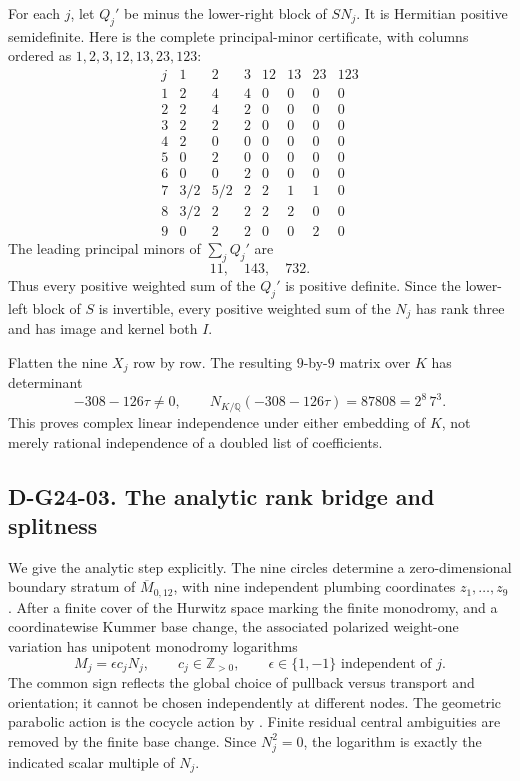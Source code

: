 For each \(j\), let \(Q_j'\) be minus the lower-right block of \(SN_j\).
It is Hermitian positive semidefinite.  Here is the complete principal-minor
certificate, with columns ordered as
\(1,2,3,12,13,23,123\):
\[
\begin{array}{c|rrrrrrr}
 j&1&2&3&12&13&23&123\\\hline
1&2&4&4&0&0&0&0\\
2&2&4&2&0&0&0&0\\
3&2&2&2&0&0&0&0\\
4&2&0&0&0&0&0&0\\
5&0&2&0&0&0&0&0\\
6&0&0&2&0&0&0&0\\
7&3/2&5/2&2&2&1&1&0\\
8&3/2&2&2&2&2&0&0\\
9&0&2&2&0&0&2&0
\end{array}
\]
The leading principal minors of \(\sum_jQ_j'\) are
\[
                              11,\quad143,\quad732.
\]
Thus every positive weighted sum of the \(Q_j'\) is positive definite.
Since the lower-left block of \(S\) is invertible, every positive weighted
sum of the \(N_j\) has rank three and has image and kernel both \(I\).

Flatten the nine \(X_j\) row by row.  The resulting \(9\)-by-\(9\)
matrix over \(K\) has determinant
\begin{equation}\label{eq:g24-period-minor}
             -308-126\tau\ne0,
 \qquad N_{K/\mathbb Q}(-308-126\tau)=87808=2^8\,7^3.
\end{equation}
This proves complex linear independence under either embedding of \(K\),
not merely rational independence of a doubled list of coefficients.

\subsection*{D-G24-03. The analytic rank bridge and splitness}

We give the analytic step explicitly.  The nine circles determine a
zero-dimensional boundary stratum of \(\overline M_{0,12}\), with nine
independent plumbing coordinates \(z_1,\ldots,z_9\).  After a finite cover
of the Hurwitz space marking the finite monodromy, and a coordinatewise
Kummer base change, the associated polarized weight-one variation has
unipotent monodromy logarithms
\[
 M_j=\epsilon c_jN_j,\qquad c_j\in\mathbb Z_{>0},
 \qquad\epsilon\in\{1,-1\}\text{ independent of }j.
\]
The common sign reflects the global choice of pullback versus transport
and orientation; it cannot be chosen independently at different nodes.
The geometric parabolic action is the cocycle action by
\cite[Lemma 2.2 and Theorem 2.5]{G34:DWmon}.  Finite residual central
ambiguities are removed by the finite base change.  Since \(N_j^2=0\),
the logarithm is exactly the indicated scalar multiple of \(N_j\).

